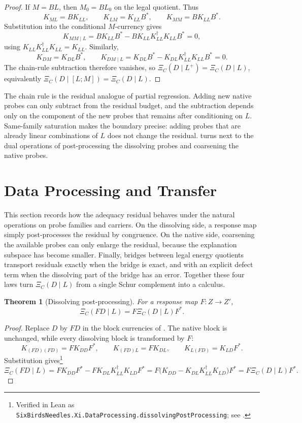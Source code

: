\documentclass[11pt]{article}
\newtheorem{theorem}{Theorem}[section]
\theoremstyle{definition}
\begin{document}
\begin{proof}
If \(M=BL\), then \(M_0=BL_0\) on the legal quotient.  Thus
\[
  K_{ML}=BK_{LL},
  \qquad
  K_{LM}=K_{LL}B^*,
  \qquad
  K_{MM}=BK_{LL}B^*.
\]
Substitution into the conditional \(M\)-currency gives
\[
  K_{MM\mid L}
  =
  BK_{LL}B^*-BK_{LL}K_{LL}^\dagger K_{LL}B^*
  =
  0,
\]
using \(K_{LL}K_{LL}^\dagger K_{LL}=K_{LL}\).  Similarly,
\[
  K_{DM}=K_{DL}B^*,
  \qquad
  K_{DM\mid L}
  =
  K_{DL}B^*-K_{DL}K_{LL}^\dagger K_{LL}B^*
  =
  0.
\]
The chain-rule subtraction therefore vanishes, so
\(\Xi_C(D\mid L^+)=\Xi_C(D\mid L)\), equivalently
\(\Xi_C(D\mid [L;M])=\Xi_C(D\mid L)\).
\end{proof}

The chain rule is the residual analogue of partial regression.  Adding new
native probes can only subtract from the residual budget, and the subtraction
depends only on the component of the new probes that remains after conditioning
on \(L\).  Same-family saturation makes the boundary precise: adding probes
that are already linear combinations of \(L\) does not change the residual.
 turns next to the dual operations of post-processing
the dissolving probes and coarsening the native probes.
 \section{Data Processing and Transfer}
\label{sec:data-processing}

This section records how the adequacy residual behaves under the natural
operations on probe families and carriers.  On the dissolving side, a response
map simply post-processes the residual by congruence.  On the native side,
coarsening the available probes can only enlarge the residual, because the
explanation subspace has become smaller.  Finally, bridges between legal
energy quotients transport residuals exactly when the bridge is exact, and with
an explicit defect term when the dissolving part of the bridge has an error.
Together these four laws turn \(\Xi_C(D\mid L)\) from a single Schur complement
into a calculus.

\begin{theorem}[Dissolving post-processing]
\label{thm:xi:dissolving-post-processing}
For a response map \(F\colon Z\to Z'\),
\[
  \boxed{\Xi_C(FD\mid L)=F\Xi_C(D\mid L)F^*.}
\]
\end{theorem}

\begin{proof}
Replace \(D\) by \(FD\) in the block currencies of
.  The native block is unchanged, while every
dissolving block is transformed by \(F\):
\[
  K_{(FD)(FD)}=FK_{DD}F^*,
  \qquad
  K_{(FD)L}=FK_{DL},
  \qquad
  K_{L(FD)}=K_{LD}F^*.
\]
Substitution gives\footnote{Verified in Lean as \texttt{SixBirdsNeedles.Xi.DataProcessing.dissolvingPostProcessing}; see .}
\[
  \Xi_C(FD\mid L)
  =
  FK_{DD}F^*-FK_{DL}K_{LL}^\dagger K_{LD}F^*
  =
  F\bigl(K_{DD}-K_{DL}K_{LL}^\dagger K_{LD}\bigr)F^*
  =
  F\Xi_C(D\mid L)F^*.
\]
\end{proof}
\end{document}
